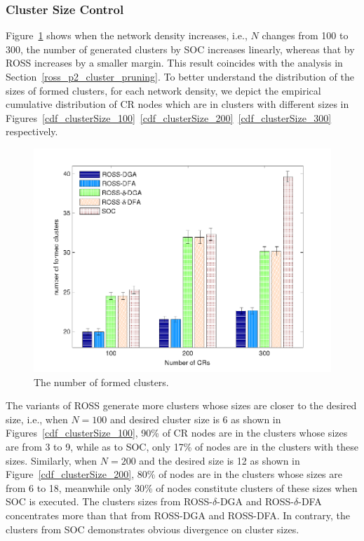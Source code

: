 \documentclass[times]{ettauth}
\newcommand{\ie}{i.e., }
\theoremstyle{mytheoremstyle}
\theoremstyle{mytheoremstyle}
\theoremstyle{mytheoremstyle}
\begin{document}
\subsubsection{Cluster Size Control}
Figure~\ref{nClusters_largeNetwork} shows when the network density increases, \ie $N$ changes from 100 to 300, the number of generated clusters by SOC increases linearly, whereas that by ROSS increases by a smaller margin.
This result coincides with the analysis in Section~\ref{ross_p2_cluster_pruning}.
To better understand the distribution of the sizes of formed clusters, for each network density, we depict the empirical cumulative distribution of CR nodes which are in clusters with different sizes in Figures~\ref{cdf_clusterSize_100}~\ref{cdf_clusterSize_200}~\ref{cdf_clusterSize_300} respectively.
\begin{figure}[!h]
  \centering
   \includegraphics[width=0.7\linewidth]{nClusters_largeNetwork.pdf}
  \caption{The number of formed clusters.}
  \label{nClusters_largeNetwork}
\end{figure}

The variants of ROSS generate more clusters whose sizes are closer to the desired size, \ie when $N=100$ and desired cluster size is 6 as shown in Figures~\ref{cdf_clusterSize_100}, 90\% of CR nodes are in the clusters whose sizes are from 3 to 9, while as to SOC, only 17\% of nodes are in the clusters with these sizes.
Similarly, when $N=200$ and the desired size is 12 as shown in Figure~\ref{cdf_clusterSize_200}, 80\% of nodes are in the clusters whose sizes are from 6 to 18, meanwhile only 30\% of nodes constitute clusters of these sizes when SOC is executed.
The clusters sizes from ROSS-$\delta$-DGA and ROSS-$\delta$-DFA concentrates more than that from ROSS-DGA and ROSS-DFA.
In contrary, the clusters from SOC demonstrates obvious divergence on cluster sizes.
\end{document}
